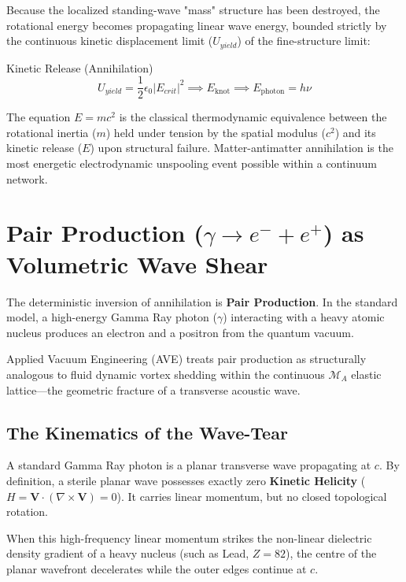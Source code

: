 Because the localized standing-wave "mass" structure has been destroyed, the rotational energy becomes propagating linear wave energy, bounded strictly by the continuous kinetic displacement limit ($U_{yield}$) of the fine-structure limit:
\begin{resultbox}{Kinetic Release (Annihilation)}
\begin{equation}
    U_{yield} = \frac{1}{2}\epsilon_0 |E_{crit}|^2 \implies E_{\text{knot}} \implies E_{\text{photon}} = h\nu
\end{equation}
\end{resultbox}

The equation $E=mc^2$ is the classical thermodynamic equivalence between the rotational inertia ($m$) held under tension by the spatial modulus ($c^2$) and its kinetic release ($E$) upon structural failure. Matter-antimatter annihilation is the most energetic electrodynamic unspooling event possible within a continuum network.

\section{Pair Production ($\gamma \to e^- + e^+$) as Volumetric Wave Shear}

The deterministic inversion of annihilation is \textbf{Pair Production}. In the standard model, a high-energy Gamma Ray photon ($\gamma$) interacting with a heavy atomic nucleus produces an electron and a positron from the quantum vacuum. 

Applied Vacuum Engineering (AVE) treats pair production as structurally analogous to fluid dynamic vortex shedding within the continuous $\mathcal{M}_A$ elastic lattice---the geometric fracture of a transverse acoustic wave.

\subsection{The Kinematics of the Wave-Tear}
A standard Gamma Ray photon is a planar transverse wave propagating at $c$. By definition, a sterile planar wave possesses exactly zero \textbf{Kinetic Helicity} ($H = \mathbf{V} \cdot (\nabla \times \mathbf{V}) = 0$). It carries linear momentum, but no closed topological rotation.

When this high-frequency linear momentum strikes the non-linear dielectric density gradient of a heavy nucleus (such as Lead, $Z=82$), the centre of the planar wavefront decelerates while the outer edges continue at $c$.

